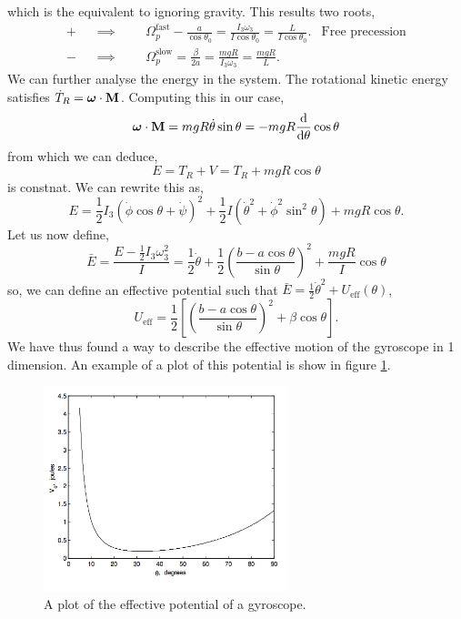 \documentclass{book}
\begin{document}
which is the equivalent to ignoring gravity. This results two roots,
\begin{align}
	+ && \implies && &\Omega_p^{\text{fast}} - \frac{a}{\cos\theta_0} = \frac{I_3\omega_3}{I\cos\theta_0} = \frac{L}{I\cos\theta_0}. & \text{Free precession} \\
	- && \implies && &\Omega_p^{\text{slow}}=\frac{\beta}{2a} = \frac{mgR}{I_3\omega_3} = \frac{mgR}{L}. &
\end{align}
We can further analyse the energy in the system. The rotational kinetic energy satisfies $\Dot{T}_R = \vb*{\omega}\cdot\vb{M}$. Computing this in our case,
\begin{equation}
	\vb*{\omega}\cdot{\vb{M}} = mgR\Dot{\theta}\sin\theta = -mgR\dv{}{\theta}\cos\theta
\end{equation}
from which we can deduce,
\begin{equation}
	E = T_R + V = T_R + mgR\cos\theta
\end{equation}
is constnat. We can rewrite this as,
\begin{equation}
	E = \frac{1}{2}I_3(\Dot{\phi}\cos\theta + \Dot{\psi})^2 + \frac{1}{2}I(\Dot{\theta}^2 + \Dot{\phi}^2 \sin^2\theta)+ mgR\cos\theta.
\end{equation}
Let us now define,
\begin{equation}
	\bar{E}= \frac{E - \frac{1}{2}I_3\omega_3^2}{I} = \frac{1}{2}\Dot{\theta} + \frac{1}{2}\left(\frac{b-a\cos\theta}{\sin\theta}\right)^2
 + \frac{mgR}{I}\cos\theta
 \end{equation}
so, we can define  an effective potential such that $\bar{E} = \frac{1}{2}\Dot{\theta}^2 + U_{\text{eff}}(\theta)$,
\begin{equation}
	U_{\text{eff}} = \frac{1}{2}\left[\left(\frac{b-a\cos\theta}{\sin\theta}\right)^2 +  \beta\cos\theta \right].
\end{equation}
We have thus found a way to describe the effective motion of the gyroscope in 1 dimension. An example of a plot of this potential is show in figure \ref{effpotgyro}.
\begin{figure}
	\centering
	\includegraphics[width=200pt]{FigureIV.32.png}
	\caption{A plot of the effective potential of a gyroscope.}
	\label{effpotgyro}
\end{figure}
\end{document}
